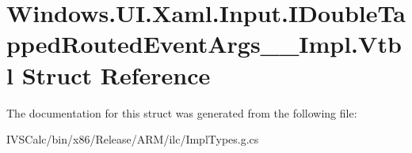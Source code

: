 \hypertarget{struct_windows_1_1_u_i_1_1_xaml_1_1_input_1_1_i_double_tapped_routed_event_args_____impl_1_1_vtbl}{}\section{Windows.\+U\+I.\+Xaml.\+Input.\+I\+Double\+Tapped\+Routed\+Event\+Args\+\_\+\+\_\+\+Impl.\+Vtbl Struct Reference}
\label{struct_windows_1_1_u_i_1_1_xaml_1_1_input_1_1_i_double_tapped_routed_event_args_____impl_1_1_vtbl}


The documentation for this struct was generated from the following file\+:\begin{DoxyCompactItemize}
\item 
I\+V\+S\+Calc/bin/x86/\+Release/\+A\+R\+M/ilc/Impl\+Types.\+g.\+cs\end{DoxyCompactItemize}
